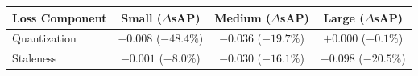 \begin{tabular}{lccc}
\toprule
Loss Component & Small ($\Delta$sAP) & Medium ($\Delta$sAP) & Large ($\Delta$sAP) \\
\midrule
Quantization
& $-0.008$ ($-48.4\%$)
& $-0.036$ ($-19.7\%$)
& $+0.000$ ($+0.1\%$) \\

Staleness
& $-0.001$ ($-8.0\%$)
& $-0.030$ ($-16.1\%$)
& $-0.098$ ($-20.5\%$) \\
\bottomrule
\end{tabular}
